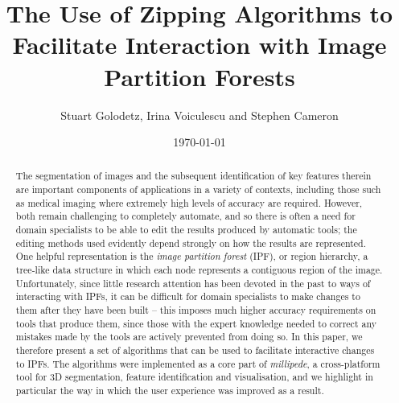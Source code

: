 \documentclass[a4paper]{article}
\begin{document}
\title{The Use of Zipping Algorithms to Facilitate Interaction with Image Partition Forests}
\author{Stuart Golodetz, Irina Voiculescu and Stephen Cameron}
\date{\today}
\maketitle

\begin{abstract}

\noindent The segmentation of images and the subsequent identification of key features therein are important components of applications in a variety of contexts, including those such as medical imaging where extremely high levels of accuracy are required. However, both remain challenging to completely automate, and so there is often a need for domain specialists to be able to edit the results produced by automatic tools; the editing methods used evidently depend strongly on how the results are represented. One helpful representation is the \emph{image partition forest} (IPF), or region hierarchy, a tree-like data structure in which each node represents a contiguous region of the image. Unfortunately, since little research attention has been devoted in the past to ways of interacting with IPFs, it can be difficult for domain specialists to make changes to them after they have been built -- this imposes much higher accuracy requirements on tools that produce them, since those with the expert knowledge needed to correct any mistakes made by the tools are actively prevented from doing so. In this paper, we therefore present a set of algorithms that can be used to facilitate interactive changes to IPFs. The algorithms were implemented as a core part of \emph{millipede}, a cross-platform tool for 3D segmentation, feature identification and visualisation, and we highlight in particular the way in which the user experience was improved as a result.
\end{abstract}
\end{document}
